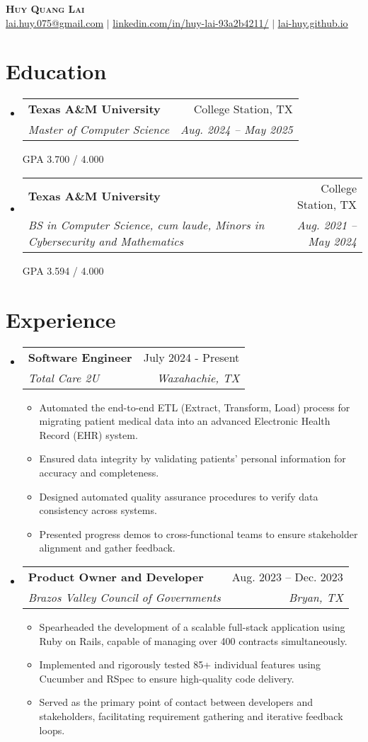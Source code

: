 \documentclass[letterpaper,12pt]{article}
\makeatletter
\newcommand{\resumeItem}[1]{
  \item\small{
    {#1 \vspace{-2pt}}
  }
}
\newcommand{\resumeSubheading}[4]{
  \vspace{-2pt}\item
    \begin{tabular*}{0.97\textwidth}[t]{l@{\extracolsep{\fill}}r}
      \textbf{#1} & #2 \\
      \textit{\small#3} & \textit{\small #4} \\
    \end{tabular*}\vspace{-7pt}
}
\newcommand{\resumeSubHeadingListStart}{\begin{itemize}[leftmargin=0pt, label={}]}
\newcommand{\resumeSubHeadingListEnd}{\end{itemize}}
\newcommand{\resumeItemListStart}{\begin{itemize}[leftmargin=10pt]}
\newcommand{\resumeItemListEnd}{\end{itemize}\vspace{-10pt}}
\makeatother
\begin{document}
\begin{center}
    \textbf{\Huge \scshape Huy Quang Lai} \\ \vspace{1pt}
    \small \href{mailto:lai.huy.075@gmail.com}{\underline{lai.huy.075@gmail.com}} $|$
    \href{https://www.linkedin.com/in/huy-lai-93a2b4211/}{\underline{linkedin.com/in/huy-lai-93a2b4211/}} $|$
    \href{https://lai-huy.github.io}{\underline{lai-huy.github.io}}
\end{center}


\vspace{-12pt}
\section{Education}
  \resumeSubHeadingListStart
    \resumeSubheading
      {Texas A\&M University}{College Station, TX}
      {Master of Computer Science }{Aug. 2024 -- May 2025}

    \noindent
    \small{GPA 3.700 / 4.000}
  
    \resumeSubheading
      {Texas A\&M University}{College Station, TX}
      {BS in Computer Science, cum laude, Minors in Cybersecurity and Mathematics}{Aug. 2021 -- May 2024}

    \noindent
    \small{GPA 3.594 / 4.000}
  \resumeSubHeadingListEnd

\vspace{-16pt}
\section{Experience}
  \resumeSubHeadingListStart
    \resumeSubheading
      {Software Engineer}{July 2024 - Present}
      {Total Care 2U}{Waxahachie, TX}
      \resumeItemListStart
        \resumeItem{Automated the end-to-end ETL (Extract, Transform, Load) process for migrating patient medical data into an advanced Electronic Health Record (EHR) system.}
        \resumeItem{Ensured data integrity by validating patients' personal information for accuracy and completeness.}
        \resumeItem{Designed automated quality assurance procedures to verify data consistency across systems.}
        \resumeItem{Presented progress demos to cross-functional teams to ensure stakeholder alignment and gather feedback.}
    \resumeItemListEnd

    \vspace{-10pt}
    \resumeSubheading
      {Product Owner and Developer}{Aug. 2023 -- Dec. 2023}
      {Brazos Valley Council of Governments }{Bryan, TX}
      \resumeItemListStart
        \resumeItem{Spearheaded the development of a scalable full-stack application using Ruby on Rails, capable of managing over 400 contracts simultaneously.}
        \resumeItem{Implemented and rigorously tested 85+ individual features using Cucumber and RSpec to ensure high-quality code delivery.}
        \resumeItem{Served as the primary point of contact between developers and stakeholders, facilitating requirement gathering and iterative feedback loops.}
      \resumeItemListEnd
  \resumeSubHeadingListEnd
\end{document}
